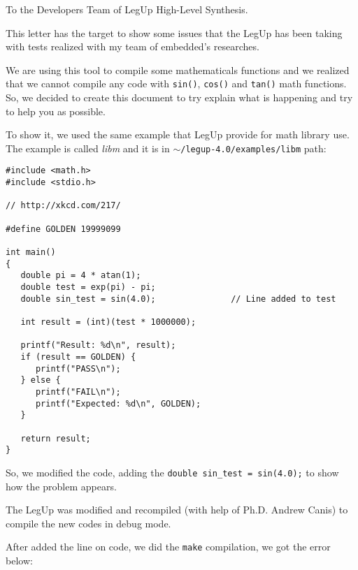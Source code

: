 \documentclass[11pt]{letter}
\date{\today.}
\begin{document}
\begin{letter}{To the Developers Team of LegUp High-Level Synthesis.}
\opening{}

This letter has the target to show some issues that the LegUp has been taking with tests realized with my team of embedded's researches.

We are using this tool to compile some mathematicals functions and we realized that we cannot compile any code with \texttt{sin()}, \texttt{cos()} and \texttt{tan()} math functions. 
So, we decided to create this document to try explain what is happening and try to help you as possible.

To show it, we used the same example that LegUp provide for math library use. 
The example is called \textit{libm} and it is in \texttt{$\sim$/legup-4.0/examples/libm} path:

{ \footnotesize
\begin{verbatim}
#include <math.h>
#include <stdio.h>

// http://xkcd.com/217/

#define GOLDEN 19999099

int main()
{
   double pi = 4 * atan(1);
   double test = exp(pi) - pi;
   double sin_test = sin(4.0);               // Line added to test
   
   int result = (int)(test * 1000000);

   printf("Result: %d\n", result);
   if (result == GOLDEN) {
      printf("PASS\n");
   } else {
      printf("FAIL\n");
      printf("Expected: %d\n", GOLDEN);
   }

   return result;
}
\end{verbatim}
}

So, we modified the code, adding the \texttt{double sin\_test = sin(4.0);} to show how the problem appears.

The LegUp was modified and recompiled (with help of Ph.D. Andrew Canis) to compile the new codes in debug mode.

After added the line on code, we did the \texttt{make} compilation, we got the error below:


\end{letter}
\end{document}
